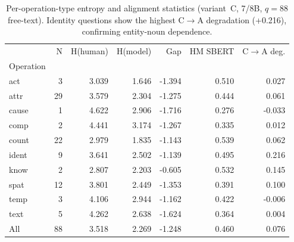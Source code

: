 \begin{table}[t]
\centering
\caption{Per-operation-type entropy and alignment statistics (variant~C, 7/8B, $q=88$ free-text). Identity questions show the highest C$\to$A degradation (+0.216), confirming entity-noun dependence.}
\label{tab:entropy_op}
\small
\begin{tabular}{lrrrrrr}
\toprule
 & N & H(human) & H(model) & Gap & HM SBERT & C$\to$A deg. \\
Operation &  &  &  &  &  &  \\
\midrule
act & 3 & 3.039 & 1.646 & -1.394 & 0.510 & 0.027 \\
attr & 29 & 3.579 & 2.304 & -1.275 & 0.444 & 0.061 \\
cause & 1 & 4.622 & 2.906 & -1.716 & 0.276 & -0.033 \\
comp & 2 & 4.441 & 3.174 & -1.267 & 0.335 & 0.012 \\
count & 22 & 2.979 & 1.835 & -1.143 & 0.539 & 0.062 \\
ident & 9 & 3.641 & 2.502 & -1.139 & 0.495 & 0.216 \\
know & 2 & 2.807 & 2.203 & -0.605 & 0.532 & 0.145 \\
spat & 12 & 3.801 & 2.449 & -1.353 & 0.391 & 0.100 \\
temp & 3 & 4.106 & 2.944 & -1.162 & 0.422 & -0.006 \\
text & 5 & 4.262 & 2.638 & -1.624 & 0.364 & 0.004 \\
All & 88 & 3.518 & 2.269 & -1.248 & 0.460 & 0.076 \\
\bottomrule
\end{tabular}
\end{table}
